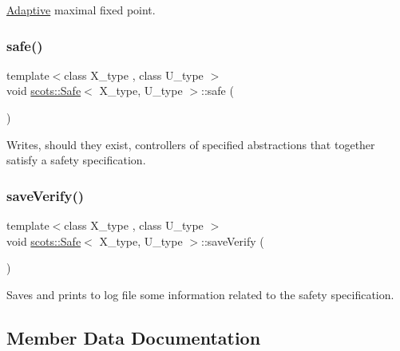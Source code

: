 \hyperlink{classscots_1_1Adaptive}{Adaptive} maximal fixed point. \mbox{\label{classscots_1_1Safe_af5ea22ef6bd1f86dd1a6f7ef6e590492}} 
\subsubsection{\texorpdfstring{safe()}{safe()}}
{\footnotesize\ttfamily template$<$class X\+\_\+type , class U\+\_\+type $>$ \\
void \hyperlink{classscots_1_1Safe}{scots\+::\+Safe}$<$ X\+\_\+type, U\+\_\+type $>$\+::safe (\begin{DoxyParamCaption}{ }\end{DoxyParamCaption})\hspace{0.3cm}{\ttfamily [inline]}}

Writes, should they exist, controllers of specified abstractions that together satisfy a safety specification. \mbox{\label{classscots_1_1Safe_ab6866ae8860c91feb49467556f0a8598}} 
\subsubsection{\texorpdfstring{save\+Verify()}{saveVerify()}}
{\footnotesize\ttfamily template$<$class X\+\_\+type , class U\+\_\+type $>$ \\
void \hyperlink{classscots_1_1Safe}{scots\+::\+Safe}$<$ X\+\_\+type, U\+\_\+type $>$\+::save\+Verify (\begin{DoxyParamCaption}{ }\end{DoxyParamCaption})\hspace{0.3cm}{\ttfamily [inline]}}

Saves and prints to log file some information related to the safety specification. 

\subsection{Member Data Documentation}
\mbox{\label{classscots_1_1Safe_a30e38b9a75a8bf34efb2512465ea9468}} 
